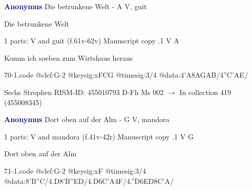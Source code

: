 \documentclass[twocolumn]{book}
\begin{document}
\newline \par \vspace{7pt} \textcolor{darkblue}{\textbf{Anonymus  }}
\newline Die betrunkene Welt - A
\newline V, guit
\newline \begin{itshape}[heading, f.61v:] Die betrunkene Welt\end{itshape} 
\newline \textcolor{darkblue}{}  1 parts: V and guit  (f.61v-62v)
\newline Manuscript copy
.1  V  A
\newline \begin{footnotesize} Komm ich soeben zum Wirtshaus heraus \end{footnotesize}  
\begin{filecontents*}{70-1.code}
@clef:G-2
@keysig:xFCG
@timesig:3/4
@data:4'A{8AG}{AB}/4''C'AE/
\end{filecontents*}
\newline
%

\newline Sechs Strophen
\newline RISM-ID: 455010793
\newline D-Fh  Ms 002
\newline $\rightarrow$ In collection 419 (455008345)
      
\newline \par \vspace{7pt} \textcolor{darkblue}{\textbf{Anonymus  }}
\newline Dort oben auf der Alm - G
\newline V, mandora
\newline \begin{itshape}\end{itshape} 
\newline \textcolor{darkblue}{}  1 parts: V and mandora  (f.41v-42r)
\newline Manuscript copy
.1  V  G
\newline \begin{footnotesize} Dort oben auf der Alm \end{footnotesize}  
\begin{filecontents*}{71-1.code}
@clef:G-2
@keysig:xF
@timesig:3/4
@data:{8'B''C}/4.D8'B''ED/4.D{6C'A}4F/4.''D{6ED}{8C'A}/
\end{filecontents*}
\newline
%
\end{document}
